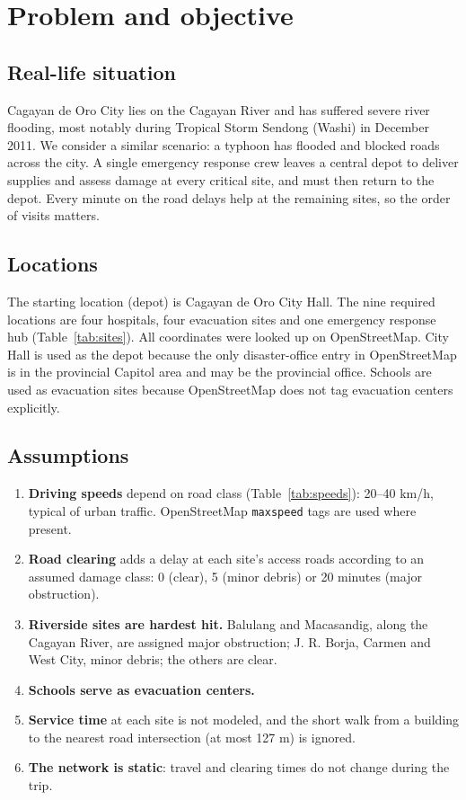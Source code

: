 \documentclass[11pt,a4paper]{article}
\begin{document}
\section{Problem and objective}\label{sec:problem}
\subsection{Real-life situation}
Cagayan de Oro City lies on the Cagayan River and has suffered severe river flooding, most notably during Tropical Storm Sendong (Washi) in December 2011. We consider a similar scenario: a typhoon has flooded and blocked roads across the city. A single emergency response crew leaves a central depot to deliver supplies and assess damage at every critical site, and must then return to the depot. Every minute on the road delays help at the remaining sites, so the order of visits matters.

\subsection{Locations}
The starting location (depot) is Cagayan de Oro City Hall. The nine required locations are four hospitals, four evacuation sites and one emergency response hub (Table~\ref{tab:sites}). All coordinates were looked up on OpenStreetMap. City Hall is used as the depot because the only disaster-office entry in OpenStreetMap is in the provincial Capitol area and may be the provincial office. Schools are used as evacuation sites because OpenStreetMap does not tag evacuation centers explicitly.

\SitesTable

\subsection{Assumptions}
\begin{enumerate}[noitemsep]
  \item \textbf{Driving speeds} depend on road class (Table~\ref{tab:speeds}): 20--40 km/h, typical of urban traffic. OpenStreetMap \texttt{maxspeed} tags are used where present.
  \item \textbf{Road clearing} adds a delay at each site's access roads according to an assumed damage class: 0 (clear), 5 (minor debris) or 20 minutes (major obstruction).
  \item \textbf{Riverside sites are hardest hit.} Balulang and Macasandig, along the Cagayan River, are assigned major obstruction; J. R. Borja, Carmen and West City, minor debris; the others are clear.
  \item \textbf{Schools serve as evacuation centers.}
  \item \textbf{Service time} at each site is not modeled, and the short walk from a building to the nearest road intersection (at most 127 m) is ignored.
  \item \textbf{The network is static}: travel and clearing times do not change during the trip.
\end{enumerate}
\end{document}
